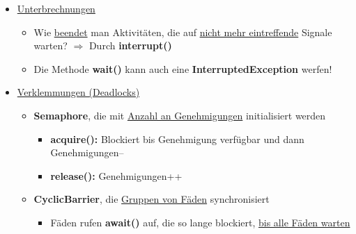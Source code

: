 \begin{itemize}
\begin{itemize}
\begin{itemize}
						$\Rightarrow$ Monitor ist \dq this\dq und \underline{kann weggelassen} werden
						\newline
						$\Rightarrow$ Falls \underline{nicht} im synchronized-Block: \textbf{IllegalMonitorStateException}
					\end{itemize}
					\item wait():
					\begin{itemize}
						\item Setzt Faden in \textbf{Wartezustand bis Signal} eintritt
											
						\color{red}{$\Rightarrow$ IMMER in einer Schleife!}
						\newline							
						\color{red}{$\Rightarrow$ Bedingung VOR und NACH dem Warten prüfen!}
					\end{itemize}
					\item notify(), notifyAll():
					\begin{itemize}
						\item Schicken \textbf{Signale an wartende Aktivitäten}
													
						\color{red}{$\Rightarrow$ Sicher ist nur: notifyAll()}
					\end{itemize}
				\end{itemize}
				\item \underline{Unterbrechnungen}
				\begin{itemize}
					\item Wie \underline{beendet} man Aktivitäten, die auf \underline{nicht mehr eintreffende} Signale warten?
					$\Rightarrow$ Durch \textbf{interrupt()}
					\item Die Methode \textbf{wait()} kann auch eine \textbf{InterruptedException} werfen!
				\end{itemize}
				\item \underline{Verklemmungen (Deadlocks)}
				\begin{itemize}
					\item \textbf{Semaphore}, die mit \underline{Anzahl an Genehmigungen} initialisiert werden
					\begin{itemize}
						\item \textbf{acquire():} Blockiert bis Genehmigung verfügbar und dann Genehmigungen--
						\item \textbf{release():} Genehmigungen++
					\end{itemize}
					\item \textbf{CyclicBarrier}, die \underline{Gruppen von Fäden} synchronisiert
					\begin{itemize}
						\item Fäden rufen \textbf{await()} auf, die so lange blockiert, \underline{bis alle Fäden warten}
					\end{itemize}
				\end{itemize}
			\end{itemize}
				
